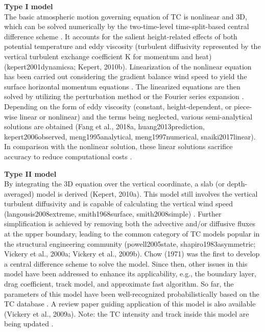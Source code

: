 \noindent\textbf{Type I model} \\The basic atmospheric motion governing equation of TC is nonlinear and 3D, which can be solved numerically by the two-time-level time-split-based central difference scheme \citep{kepert2001dynamicsa,kepert2011choosing}. It accounts for the salient height-related effects of both potential temperature and eddy viscosity (turbulent diffusivity represented by the vertical turbulent exchange coefficient K for momentum and heat) (kepert2001dynamicsa; Kepert, 2010b). Linearization of the nonlinear equation has been carried out considering the gradient balance wind speed to yield the surface horizontal momentum equations \citep{kepert2001dynamics}. The linearized equations are then solved by utilizing the perturbation method \citep{meng1995analytical} or the Fourier series expansion \citep{kepert2001dynamics}. Depending on the form of eddy viscosity (constant, height-dependent, or piece-wise linear or nonlinear) and the terms being neglected, various semi-analytical solutions are obtained (Fang et al., 2018a, huang2013prediction, kepert2006observed, meng1995analytical, meng1997numerical, snaiki2017linear). In comparison with the nonlinear solution, these linear solutions sacrifice accuracy to reduce computational costs \citep{kepert2014reply}. 
\newline

\noindent\textbf{Type II model} \\By integrating the 3D equation over the vertical coordinate, a slab (or depth-averaged) model is derived (Kepert, 2010a). This model still involves the vertical turbulent diffusivity and is capable of calculating the vertical wind speed (langousis2008extreme, smith1968surface, smith2008simple) . Further simplification is achieved by removing both the advective and/or diffusive fluxes at the upper boundary, leading to the common category of TC models popular in the structural engineering community (powell2005state, shapiro1983asymmetric; Vickery et al., 2000a; Vickery et al., 2009b). Chow (1971) was the first to develop a central difference scheme to solve the model. Since then, other issues in this model have been addressed to enhance its applicability, e.g., the boundary layer, drag coefficient, track model, and approximate fast algorithm. So far, the parameters of this model have been well-recognized probabilistically based on the TC database \citep{vickery2008statistical}. A review paper guiding application of this model is also available (Vickery et al., 2009a). Note: the TC intensity and track inside this model are being updated \citep{mudd2015development, vickery2010synthetic}. 
\newline

